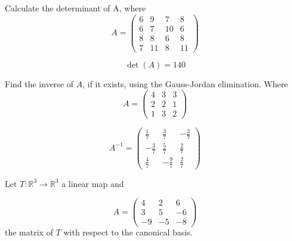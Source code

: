 \begin{questions}

\question Calculate the determinant of A, where
$$
A=\left(\begin{array}{rrrr}
6 & 9 & 7 & 8 \\
6 & 7 & 10 & 6 \\
8 & 8 & 6 & 8 \\
7 & 11 & 8 & 11
\end{array}\right)
$$

\begin{solution}
$$\det(A)=140$$
\end{solution}

\question Find the inverse of $A$, if it exists, using the Gauss-Jordan elimination. Where
$$
A=\left(\begin{array}{rrr}
4 & 3 & 3 \\
2 & 2 & 1 \\
1 & 3 & 2
\end{array}\right)
$$

\begin{solution}
$$A^{-1}=\left(\begin{array}{rrr}
\frac{1}{7} & \frac{3}{7} & -\frac{3}{7} \\
-\frac{3}{7} & \frac{5}{7} & \frac{2}{7} \\
\frac{4}{7} & -\frac{9}{7} & \frac{2}{7}
\end{array}\right)$$
\end{solution}

\question Let $T:\mathbb{R}^3\rightarrow\mathbb{R}^3$  a linear map and
 
$$
A=\left(\begin{array}{rrr}
4 & 2 & 6 \\
3 & 5 & -6 \\
-9 & -5 & -8
\end{array}\right)
$$
the matrix of $T$ with respect to the canonical basis.
\end{questions}
